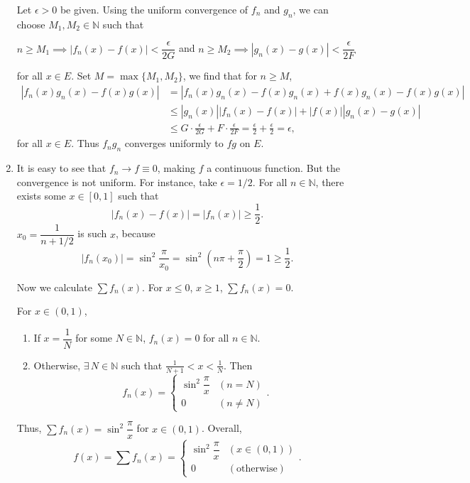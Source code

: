 \documentclass[12pt]{report}
\newcommand{\numl}[1]{\item[\large\textbf{\sffamily #1.}]}
\newcommand{\ds}{\displaystyle}
\newcommand{\abs}[1]{\left| #1 \right|}
\newcommand{\ra}{\rightarrow}
\newcommand{\N}{\mathbb{N}}
\let\oldexists\exists
\renewcommand{\exists}{\oldexists\,}
\begin{document}
\begin{enumerate}
    Let \(\epsilon > 0\) be given. Using the uniform convergence of \(f_n\) and \(g_n\), we can choose \(M_1, M_2 \in \N\) such that
    \begin{center}
        \(n \geq M_1 \implies \abs{f_n(x) - f(x)} < \dfrac{\epsilon}{2G}\) and \(n \geq M_2 \implies \abs{g_n(x) - g(x)} < \dfrac{\epsilon}{2F}\)
    \end{center}
    for all \(x \in E\). Set \(M = \max\{M_1, M_2\}\), we find that for \(n \geq M\),
    \[
        \begin{aligned}
            \abs{f_n(x)g_n(x) - f(x)g(x)} & = \abs{f_n(x)g_n(x) - f(x)g_n(x) + f(x)g_n(x) - f(x)g(x)}                                                            \\
                                          & \leq \abs{g_n(x)}\abs{f_n(x) - f(x)} + \abs{f(x)} \abs{g_n(x) - g(x)}                                                \\
                                          & \leq G \cdot \frac{\epsilon}{2G} + F \cdot \frac{\epsilon}{2F} = \frac{\epsilon}{2} + \frac{\epsilon}{2} = \epsilon,
        \end{aligned}
    \]
    for all \(x \in E\). Thus \(f_ng_n\) converges uniformly to \(fg\) on \(E\).

    \numl{3} It is easy to see that \(f_n \ra f \equiv 0\), making \(f\) a continuous function. But the convergence is not uniform. For instance, take \(\epsilon = 1/2\). For all \(n \in \N\), there exists some \(x\in [0, 1]\) such that
    \[
        \abs{f_n(x) - f(x)} = \abs{f_n(x)} \geq \frac{1}{2}.
    \]
    \(x_0 = \dfrac{1}{n + 1/2}\) is such \(x\), because
    \[
        \abs{f_n(x_0)} = \sin^2 \dfrac{\pi}{x_0} = \sin^2 \left(n\pi + \frac{\pi}{2}\right) = 1 \geq \frac{1}{2}.
    \]

    Now we calculate \(\sum f_n(x)\). For \(x \leq 0\), \(x \geq 1\), \(\sum f_n(x) = 0\).

    For \(x \in (0, 1)\),
    \begin{enumerate}
        \item If \(x = \dfrac{1}{N}\) for some \(N \in \N\), \(f_n(x) = 0\) for all \(n \in \N\).
        \item Otherwise, \(\exists N \in \N\) such that \(\ds \frac{1}{N + 1} < x < \frac{1}{N}\). Then
              \[
                  f_n(x) = \begin{cases}
                      \sin^2 \dfrac{\pi}{x} & (n = N)    \\
                      0                     & (n \neq N)
                  \end{cases}.
              \]
    \end{enumerate}
    Thus, \(\sum f_n(x) = \sin^2 \dfrac{\pi}{x}\) for \(x \in (0, 1)\). Overall,
    \[
        f(x) = \sum f_n(x) = \begin{cases}
            \sin^2 \dfrac{\pi}{x} & (x \in (0, 1))     \\
            0                     & (\text{otherwise})
        \end{cases}.
    \]


\end{enumerate}
\end{document}
